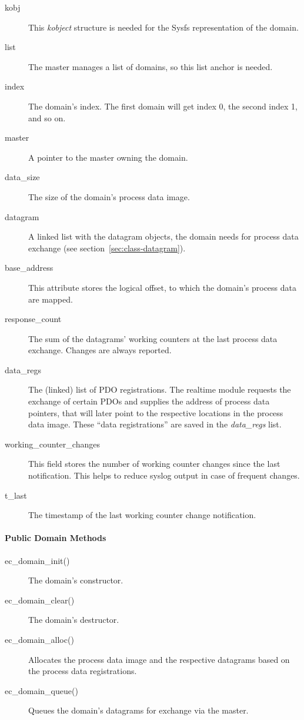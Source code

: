 \documentclass[a4paper,12pt,BCOR6mm,bibtotoc,idxtotoc]{scrbook}
\begin{document}
\begin{description}
\item[kobj] This \textit{kobject} structure is needed for the Sysfs
  representation of the domain.
\item[list] The master manages a list of domains, so this list anchor
  is needed.
\item[index] The domain's index. The first domain will get index 0,
  the second index 1, and so on.
\item[master] A pointer to the master owning the domain.
\item[data\_size] The size of the domain's process data image.
\item[datagram] A linked list with the datagram objects, the domain
  needs for process data exchange (see
  section~\ref{sec:class-datagram}).
\item[base\_address] This attribute stores the logical offset, to
  which the domain's process data are mapped.
\item[response\_count] The sum of the datagrams' working counters at
  the last process data exchange. Changes are always reported.
\item[data\_regs] The (linked) list of PDO registrations. The realtime
  module requests the exchange of certain PDOs and supplies the
  address of process data pointers, that will later point to the
  respective locations in the process data image. These ``data
  registrations'' are saved in the \textit{data\_regs} list.
\item[working\_counter\_changes] This field stores the number of
  working counter changes since the last notification. This helps to
  reduce syslog output in case of frequent changes.
\item[t\_last] The timestamp of the last working counter change
  notification.
\end{description}

\paragraph{Public Domain Methods}

\begin{description}
\item[ec\_domain\_init()] The domain's constructor.
\item[ec\_domain\_clear()] The domain's destructor.
\item[ec\_domain\_alloc()] Allocates the process data image and the
  respective datagrams based on the process data registrations.
\item[ec\_domain\_queue()] Queues the domain's datagrams for exchange
  via the master.
\end{description}
\end{document}
